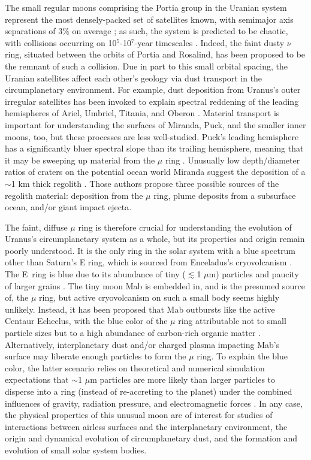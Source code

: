 \documentclass[preprint]{aastex631}
\begin{document}
The small regular moons comprising the Portia group in the Uranian system represent the most densely-packed set of satellites known, with semimajor axis separations of 3\% on average \citep{showalter20}; as such, the system is predicted to be chaotic, with collisions occurring on 10$^5$-10$^7$-year timescales \citep{duncan97, french12}. Indeed, the faint dusty $\nu$ ring, situated between the orbits of Portia and Rosalind, has been proposed to be the remnant of such a collision. Due in part to this small orbital spacing, the Uranian satellites affect each other's geology via dust transport in the circumplanetary environment. For example, dust deposition from Uranus's outer irregular satellites has been invoked to explain spectral reddening of the leading hemispheres of Ariel, Umbriel, Titania, and Oberon \citep{cartwright18}. Material transport is important for understanding the surfaces of Miranda, Puck, and the smaller inner moons, too, but these processes are less well-studied. 
Puck's leading hemisphere has a significantly bluer spectral slope than its trailing hemisphere, meaning that it may be sweeping up material from the $\mu$ ring \citep{french17}. %
Unusually low depth/diameter ratios of craters on the potential ocean world Miranda suggest the deposition of a $\sim$1 km thick regolith \citep{cartwright21, beddingfield22}. Those authors propose three possible sources of the regolith material: deposition from the $\mu$ ring, plume deposits from a subsurface ocean, and/or giant impact ejecta.

The faint, diffuse $\mu$ ring is therefore crucial for understanding the evolution of Uranus's circumplanetary system as a whole, but its properties and origin remain poorly understood.
It is the only ring in the solar system with a blue spectrum other than Saturn's E ring, which is sourced from Enceladus's cryovolcanism \citep{depater06}. The E~ring is blue due to its abundance of tiny ($\lesssim$1 $\mu$m) particles and paucity of larger grains \citep{showalter91, depater04, hillier07}. The tiny moon Mab is embedded in, and is the presumed source of, the $\mu$ ring, but active cryovolcanism on such a small body seems highly unlikely. Instead, it has been proposed that Mab outbursts like the active Centaur Echeclus, with the blue color of the $\mu$ ring attributable not to small particle sizes but to a high abundance of carbon-rich organic matter \citep{seccull19}. Alternatively, interplanetary dust and/or charged plasma impacting Mab's surface may liberate enough particles to form the $\mu$ ring. To explain the blue color, the latter scenario relies on theoretical and numerical simulation expectations that $\sim$1 $\mu$m particles are more likely than larger particles to disperse into a ring (instead of re-accreting to the planet) under the combined influences of gravity, radiation pressure, and electromagnetic forces \citep{horanyi92, sfair09, sfair12}. In any case, the physical properties of this unusual moon are of interest for studies of interactions between airless surfaces and the interplanetary environment, the origin and dynamical evolution of circumplanetary dust, and the formation and evolution of small solar system bodies.
\end{document}
